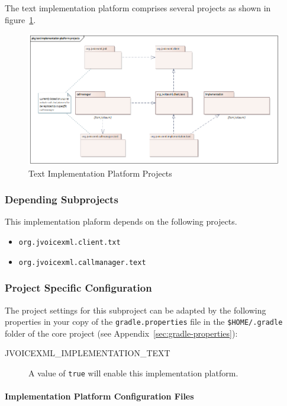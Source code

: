 \documentclass[11pt,a4paper]{article}
\begin{document}
The text implementation platform comprises several projects as shown in figure~\ref{fig:text-implementation-platform-projects}.
\begin{figure}
\includegraphics[width=\linewidth]{text-implementation-platform-projects.png}
\caption{Text Implementation Platform Projects}
\label{fig:text-implementation-platform-projects}
\end{figure}

\subsubsection{Depending Subprojects}

This implementation plaform depends on the following projects.
\begin{itemize}
\item \texttt{org.jvoicexml.client.txt}
\item \texttt{org.jvoicexml.callmanager.text}
\end{itemize}

\subsubsection{Project Specific Configuration}

The project settings for this subproject can be adapted by the following 
properties in your copy of the \texttt{gradle.properties} file in the
\texttt{\${HOME}/.gradle} folder of the core project (see 
Appendix~\ref{sec:gradle-properties}):

\begin{description}
\item[JVOICEXML\_IMPLEMENTATION\_TEXT] A value of \texttt{true} will enable this implementation
platform.
\end{description}

\paragraph{Implementation Platform Configuration Files}
\end{document}
